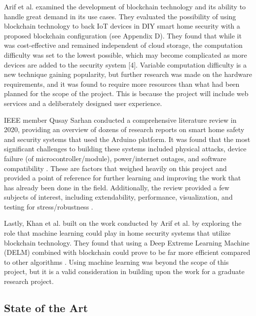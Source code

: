 \documentclass[conference]{IEEEtran}
\begin{document}
Arif et al. examined the development of blockchain technology and its ability to
handle great demand in its use cases. They evaluated the possibility of using blockchain
technology to back IoT devices in DIY smart home security with a proposed blockchain
configuration (see Appendix D). They found that while it was cost-effective and remained
independent of cloud storage, the computation difficulty was set to the lowest possible,
which may become complicated as more devices are added to the security system [4].
Variable computation difficulty is a new technique gaining popularity, but further
research was made on the hardware requirements, and it was found to require more
resources than what had been planned for the scope of the project.
This is because the project will include web services and a deliberately
designed user experience.

IEEE member Qusay Sarhan conducted a comprehensive literature review in 2020, providing an
overview of dozens of research reports on smart home safety and security systems that
used the Arduino platform. It was found that the most significant challenges to building
these systems included physical attacks, device failure (of microcontroller/module),
power/internet outages, and software compatibility \cite{sarhan2020}. These are factors
that weighed heavily on this project and provided a point of reference for further learning
and improving the work that has already been done in the field. Additionally, the review
provided a few subjects of interest, including extendability, performance, visualization,
and testing for stress/robustness \cite{sarhan2020}.

Lastly, Khan et al. built on the work conducted by Arif et al. by exploring the role that
machine learning could play in home security systems that utilize blockchain technology.
They found that using a Deep Extreme Learning Machine (DELM) combined with blockchain could
prove to be far more efficient compared to other algorithms \cite{khanEtAl2021}.
Using machine learning was beyond the scope of this project, but it is a valid
consideration in building upon the work for a graduate research project.

\subsection{State of the Art}
\end{document}
